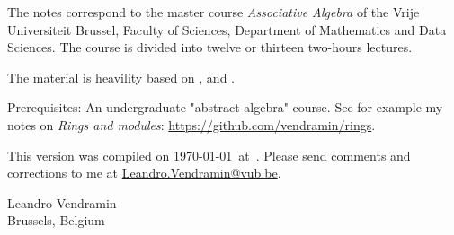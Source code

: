 \preface

The notes correspond to the master  
course \emph{Associative Algebra} of the 
Vrije Universiteit Brussel, 
Faculty of Sciences, 
Department of Mathematics and Data Sciences. The course
is divided into twelve or thirteen two-hours lectures. 

The material is heavility based on \cite{MR3308118}, \cite{MR1449137} and 
\cite{MR798076}. 

Prerequisites: An undergraduate "abstract algebra" course. See for example
my notes on \emph{Rings and modules}: \url{https://github.com/vendramin/rings}. 

\medskip
This version 
was compiled on \today~at~\currenttime.
Please send comments and corrections to me at \url{Leandro.Vendramin@vub.be}. 


\bigskip
\begin{flushright}
Leandro Vendramin\\Brussels, Belgium\par
\end{flushright}
